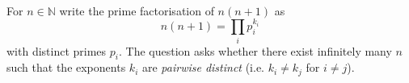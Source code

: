 \\
For $n\in\mathbb{N}$ write the prime factorisation of $n(n+1)$ as
\[
 n(n+1) = \prod_i p_i^{k_i}
\]
with distinct primes $p_i$. The question asks whether there exist infinitely many $n$ such that the exponents $k_i$ are \emph{pairwise distinct} (i.e. $k_i\ne k_j$ for $i\ne j$).
